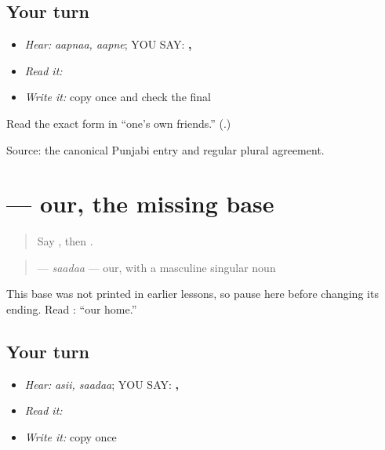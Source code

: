 \subsection*{Your turn}
\begin{itemize}
\raggedright
  \item \emph{Hear:} \emph{aapnaa, aapne}; YOU SAY: \textbf{, }
  \item \emph{Read it:} \textbf{ }
  \item \emph{Write it:} copy \textbf{} once and check the final \textbf{}
\end{itemize}

\begin{tcolorbox}[breakable,colback=teal!4,colframe=teal!35!black,title={Before you move on}]
Read the exact form in “one's own friends.” (\textbf{}.)

Source: the canonical Punjabi \textbf{} entry and regular plural agreement.
\end{tcolorbox}
\section[\texorpdfstring{\pa{ਸਾਡਾ} (saadaa)}{ਸਾਡਾ (saadaa)}]{ — our, the missing base}

\label{lesson:PA-C185-sada}



\begin{quote}
Say \textbf{}, then \textbf{}.
\end{quote}

\begin{grammarlens}[title={Grammar Lens: connect we to our}]
\begin{quote}
\textbf{} — \emph{saadaa} — our, with a masculine singular noun
\end{quote}

This base was not printed in earlier lessons, so pause here before changing its ending. Read \textbf{ }: “our home.”
\end{grammarlens}

\subsection*{Your turn}
\begin{itemize}
\raggedright
  \item \emph{Hear:} \emph{asii, saadaa}; YOU SAY: \textbf{, }
  \item \emph{Read it:} \textbf{ }
  \item \emph{Write it:} copy \textbf{} once
\end{itemize}

